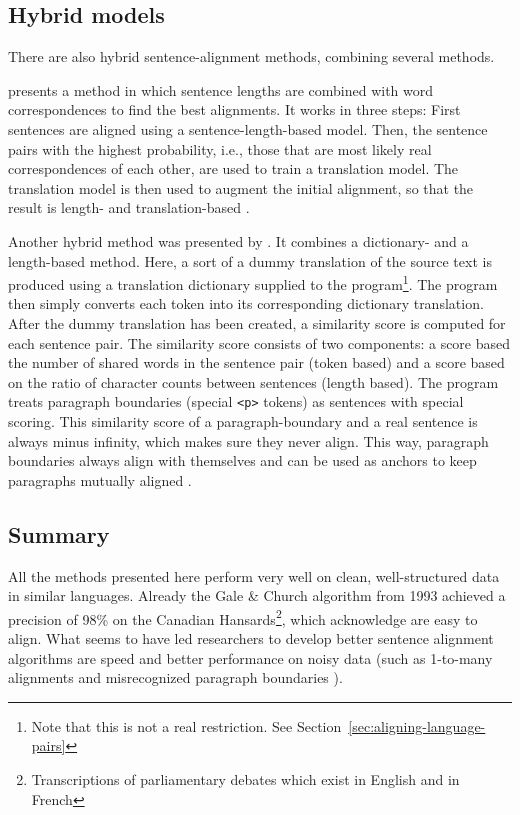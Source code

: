 \subsection{Hybrid models}
There are also hybrid sentence-alignment methods, combining several methods.


\cite{moore2002fast} presents a method in which sentence lengths are combined with word correspondences to find the best alignments. 
It works in three steps:
First sentences are aligned using a sentence-length-based model. 
Then, the sentence pairs with the highest probability, i.e., those that are most likely real correspondences of each other, are used to train a translation model. 
The translation model is then used to augment the initial alignment, so that the result is length- and translation-based \autocite{moore2002fast}.

Another hybrid method was presented by \cite{hunalign}. 
It combines a dictionary- and a length-based method.
Here, a sort of a dummy translation of the source text is produced using a translation dictionary supplied to the program\footnote{Note that this is not a real restriction. See Section~\ref{sec:aligning-language-pairs}}. 
The program then simply converts each token into its corresponding dictionary translation.
After the dummy translation has been created, a similarity score is computed for each sentence pair.
The similarity score consists of two components: a score based the number of shared words in the sentence pair (token based) and  a score based on the ratio of character counts between sentences (length based). 
The program treats paragraph boundaries (special \texttt{<p>} tokens) as sentences with special scoring. 
This similarity score of a paragraph-boundary  and a real sentence is always minus infinity, which makes sure they never align. This way, paragraph boundaries always align with themselves and can be used as anchors to keep  paragraphs mutually aligned \autocite{hunalign}.

\subsection{Summary}
All the methods presented here perform very well on clean, well-structured data in similar languages. Already the Gale \& Church algorithm from 1993 achieved a precision of 98\% on the Canadian Hansards\footnote{Transcriptions of parliamentary debates which exist in English and in French}, which \citeauthor{gale-church-1991-program} acknowledge are easy to align. 
What seems to have led researchers to develop better sentence alignment algorithms are speed \autocites{chen-1993-aligning,hunalign} and better performance on noisy data (such as 1-to-many alignments and misrecognized paragraph boundaries \autocite{sennrich-volk-2010-mt}). 

